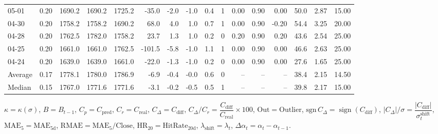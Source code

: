 \begin{threeparttable}
{\begin{tabular}{lrrrrrrrrrrrrrrr}
  05-01 &     0.20 & 1690.2 & 1690.2 & 1725.2 &      -35.0 &           -2.0 &                     -1.0 &                 0.4 &              1 &       0.00 &      0.90 &           0.00 &             50.0 &            2.87 &                  15.00 \\
  04-30 &     0.20 & 1758.2 & 1758.2 & 1690.2 &       68.0 &            4.0 &                      1.0 &                 0.7 &              1 &       0.00 &      0.90 &          -0.20 &             54.4 &            3.25 &                  20.00 \\
  04-28 &     0.20 & 1762.5 & 1782.0 & 1758.2 &       23.7 &            1.3 &                      1.0 &                 0.2 &              0 &       0.20 &      0.90 &           0.20 &             43.6 &            2.54 &                  25.00 \\
  04-25 &     0.20 & 1661.0 & 1661.0 & 1762.5 &     -101.5 &           -5.8 &                     -1.0 &                 1.1 &              1 &       0.00 &      0.90 &           0.00 &             46.6 &            2.63 &                  25.00 \\
  04-24 &     0.20 & 1639.0 & 1639.0 & 1661.0 &      -22.0 &           -1.3 &                     -1.0 &                 0.2 &              0 &       0.00 &      0.90 &           0.00 &             27.6 &            1.65 &                  25.00 \\
Average &     0.17 & 1778.1 & 1780.0 & 1786.9 &       -6.9 &           -0.4 &                     -0.0 &                 0.6 &              0 &         -- &        -- &             -- &             38.4 &            2.15 &                  14.50 \\
 Median &     0.15 & 1767.0 & 1771.6 & 1771.6 &       -3.1 &           -0.2 &                     -0.5 &                 0.5 &              1 &         -- &        -- &             -- &             39.8 &            2.17 &                  15.00 \\
\bottomrule
\end{tabular}
}
\begin{tablenotes}\footnotesize
\item $\kappa=\kappa(\sigma)$, $B=B_{t-1}$, $C_p=C_{\text{pred}}$, $C_r=C_{\text{real}}$, $C_\Delta=C_{\text{diff}}$, $C_\Delta/C_r=\dfrac{C_{\text{diff}}}{C_{\text{real}}}\times100$, $\mathrm{Out}=\text{Outlier}$, $\mathrm{sgn}\,C_\Delta=\operatorname{sign}(C_{\text{diff}})$, $|C_\Delta|/\sigma=\dfrac{|C_{\text{diff}}|}{\sigma_t^{\text{shift}}}$, $\mathrm{MAE}_5=\mathrm{MAE}_{5\text{d}}$, $\mathrm{RMAE}= \mathrm{MAE}_5 / \text{Close}$, $\mathrm{HR}_{20}=\mathrm{HitRate}_{20\text{d}}$, 
$\lambda_{\text{shift}}=\lambda_t$, 
$\Delta\alpha_t=\alpha_t-\alpha_{t-1}$.
\end{tablenotes}
\end{threeparttable}
\endgroup

